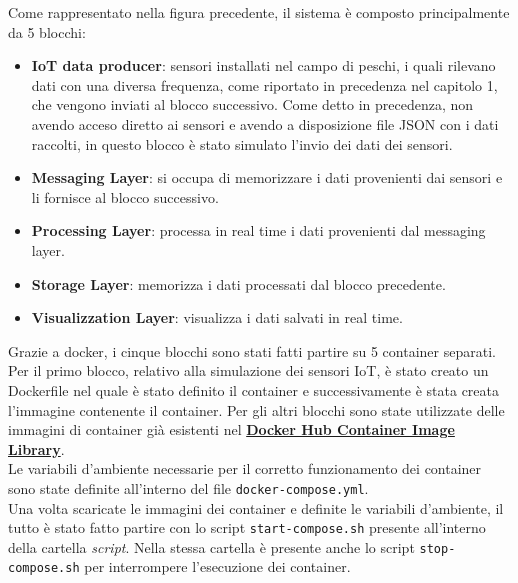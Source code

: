 \documentclass{article}
\begin{document}
\bigskip
\noindent
Come rappresentato nella figura precedente, il sistema è composto principalmente da 5 blocchi:
\begin{itemize}[noitemsep]
  \item \textbf{IoT data producer}: sensori installati nel campo di peschi, i quali rilevano dati con una diversa frequenza, come riportato in precedenza nel capitolo 1, che vengono inviati al blocco successivo. Come detto in precedenza, non avendo acceso diretto ai sensori e avendo a disposizione file JSON con i dati raccolti, in questo blocco è stato simulato l'invio dei dati dei sensori.
  \item \textbf{Messaging Layer}: si occupa di memorizzare i dati provenienti dai sensori e li fornisce al blocco successivo.
  \item \textbf{Processing Layer}: processa in real time i dati provenienti dal messaging layer.
  \item \textbf{Storage Layer}: memorizza i dati processati dal blocco precedente.
  \item \textbf{Visualizzation Layer}: visualizza i dati salvati in real time.
\end{itemize}
Grazie a docker, i cinque blocchi sono stati fatti partire su 5 container separati. Per il primo blocco, relativo alla simulazione dei sensori IoT, è stato creato un Dockerfile nel quale è stato definito il container e successivamente è stata creata l'immagine contenente il container. Per gli altri blocchi sono state utilizzate delle immagini di container già esistenti nel \href{https://hub.docker.com} {\textbf{Docker Hub Container Image Library}}.\\
Le variabili d'ambiente necessarie per il corretto funzionamento dei container sono state definite all'interno del file \texttt{docker-compose.yml}.\\
Una volta scaricate le immagini dei container e definite le variabili d'ambiente, il tutto è stato fatto partire con lo script \texttt{start-compose.sh} presente all'interno della cartella \textit{script}. Nella stessa cartella è presente anche lo script \texttt{stop-compose.sh} per interrompere l'esecuzione dei container.
\end{document}
